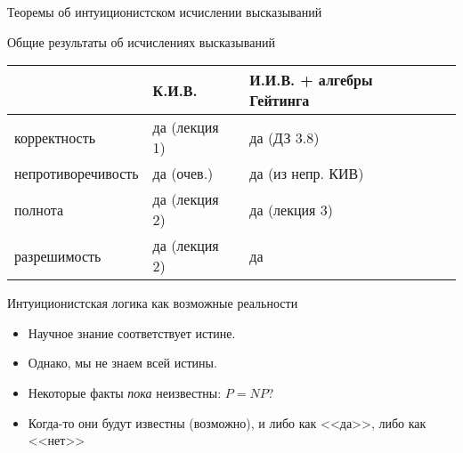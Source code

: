 \documentclass[aspectratio=169]{beamer}
\begin{document}
\newtheorem{axiom}{Аксиома}
\newtheorem{exmprus}{Пример}
\newtheorem{defrus}{Определение}
\newtheorem{lemmarus}{Лемма}
\newtheorem{thmrus}{Теорема}

\begin{frame}{}
\begin{center}\Large Теоремы об интуиционистском исчислении высказываний\end{center}
\end{frame}

\begin{frame}{Общие результаты об исчислениях высказываний}
\begin{tabular}{llll}
      & К.И.В. & И.И.В. + алгебры Гейтинга\\\hline
корректность & да (лекция 1) & да (ДЗ 3.8) \\
непротиворечивость & да (очев.) & да (из непр. КИВ) \\
полнота & да (лекция 2) & да (лекция 3)  \\
разрешимость & да (лекция 2) & да
\end{tabular}
\end{frame}

\begin{frame}{Интуиционистская логика как возможные реальности}
\begin{itemize}
\item Научное знание соответствует истине.
\item Однако, мы не знаем всей истины.
\item Некоторые факты \emph{пока} неизвестны: $P=NP$?
\item Когда-то они будут известны (возможно), и либо как <<да>>, либо как <<нет>>
\end{itemize}
\end{frame}
\end{document}

